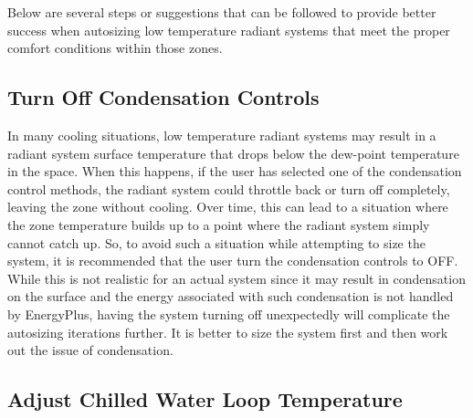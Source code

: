 Below are several steps or suggestions that can be followed to provide better success when autosizing low temperature radiant systems that meet the proper comfort conditions within those zones.

\subsection{Turn Off Condensation Controls}\label{turn-off-condensation-controls}

In many cooling situations, low temperature radiant systems may result in a radiant system surface temperature that drops below the dew-point temperature in the space.  When this happens, if the user has selected one of the condensation control methods, the radiant system could throttle back or turn off completely, leaving the zone without cooling.  Over time, this can lead to a situation where the zone temperature builds up to a point where the radiant system simply cannot catch up.  So, to avoid such a situation while attempting to size the system, it is recommended that the user turn the condensation controls to OFF.  While this is not realistic for an actual system since it may result in condensation on the surface and the energy associated with such condensation is not handled by EnergyPlus, having the system turning off unexpectedly will complicate the autosizing iterations further.  It is better to size the system first and then work out the issue of condensation.

\subsection{Adjust Chilled Water Loop Temperature}\label{adjust-chilled-water-loop-temperature}

